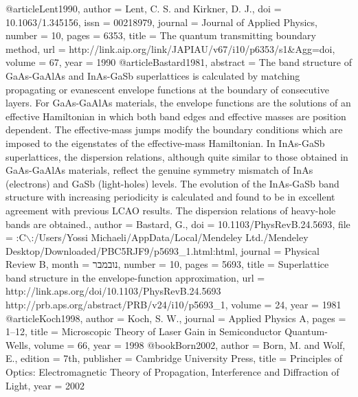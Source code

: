 @article{Lent1990,
author = {Lent, C. S. and Kirkner, D. J.},
doi = {10.1063/1.345156},
issn = {00218979},
journal = {Journal of Applied Physics},
number = {10},
pages = {6353},
title = {{The quantum transmitting boundary method}},
url = {http://link.aip.org/link/JAPIAU/v67/i10/p6353/s1\&Agg=doi},
volume = {67},
year = {1990}
}
@article{Bastard1981,
abstract = {The band structure of GaAs-GaAlAs and InAs-GaSb superlattices is calculated by matching propagating or evanescent envelope functions at the boundary of consecutive layers. For GaAs-GaAlAs materials, the envelope functions are the solutions of an effective Hamiltonian in which both band edges and effective masses are position dependent. The effective-mass jumps modify the boundary conditions which are imposed to the eigenstates of the effective-mass Hamiltonian. In InAs-GaSb superlattices, the dispersion relations, although quite similar to those obtained in GaAs-GaAlAs materials, reflect the genuine symmetry mismatch of InAs (electrons) and GaSb (light-holes) levels. The evolution of the InAs-GaSb band structure with increasing periodicity is calculated and found to be in excellent agreement with previous LCAO results. The dispersion relations of heavy-hole bands are obtained.},
author = {Bastard, G.},
doi = {10.1103/PhysRevB.24.5693},
file = {:C$\backslash$:/Users/Yossi Michaeli/AppData/Local/Mendeley Ltd./Mendeley Desktop/Downloaded/PBC5RJF9/p5693\_1.html:html},
journal = {Physical Review B},
month = {נובמבר},
number = {10},
pages = {5693},
title = {{Superlattice band structure in the envelope-function approximation}},
url = {http://link.aps.org/doi/10.1103/PhysRevB.24.5693 http://prb.aps.org/abstract/PRB/v24/i10/p5693\_1},
volume = {24},
year = {1981}
}
@article{Koch1998,
author = {Koch, S. W.},
journal = {Applied Physics A},
pages = {1--12},
title = {{Microscopic Theory of Laser Gain in Semiconductor Quantum-Wells}},
volume = {66},
year = {1998}
}
@book{Born2002,
author = {Born, M. and Wolf, E.},
edition = {7th},
publisher = {Cambridge University Press},
title = {{Principles of Optics: Electromagnetic Theory of Propagation, Interference and Diffraction of Light}},
year = {2002}
}
